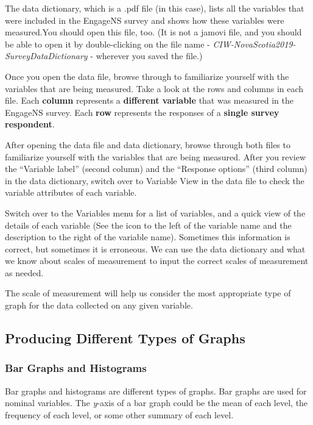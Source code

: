 \documentclass[
]{book}
\begin{document}
The data dictionary, which is a .pdf file (in this case), lists all the variables that were included in the EngageNS survey and shows how these variables were measured.You should open this file, too. (It is not a jamovi file, and you should be able to open it by double-clicking on the file name - \emph{CIW-NovaScotia2019-SurveyDataDictionary} - wherever you saved the file.)

Once you open the data file, browse through to familiarize yourself with the variables that are being measured. Take a look at the rows and columns in each file. Each \textbf{column} represents a \textbf{different variable} that was measured in the EngageNS survey. Each \textbf{row} represents the responses of a \textbf{single survey respondent}.

After opening the data file and data dictionary, browse through both files to familiarize yourself with the variables that are being measured. After you review the ``Variable label'' (second column) and the ``Response options'' (third column) in the data dictionary, switch over to Variable View in the data file to check the variable attributes of each variable.

Switch over to the {Variables} menu for a list of variables, and a quick view of the details of each variable (See the icon to the left of the variable name and the description to the right of the variable name). Sometimes this information is correct, but sometimes it is erroneous. We can use the data dictionary and what we know about scales of measurement to input the correct scales of measurement as needed.

The scale of measurement will help us consider the most appropriate type of graph for the data collected on any given variable.

\hypertarget{producing-different-types-of-graphs}{%
\subsection{Producing Different Types of Graphs}\label{producing-different-types-of-graphs}}

\hypertarget{bar-graphs-and-histograms}{%
\subsubsection{Bar Graphs and Histograms}\label{bar-graphs-and-histograms}}

Bar graphs and histograms are different types of graphs. Bar graphs are used for nominal variables. The \emph{y}-axis of a bar graph could be the mean of each level, the frequency of each level, or some other summary of each level.
\end{document}
